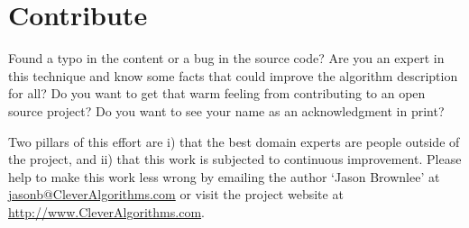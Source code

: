 \documentclass[a4paper, 11pt]{article}
\makeatletter
\newcommand{\myreportauthor}{Jason Brownlee}
\newcommand{\myreportemail}{jasonb@CleverAlgorithms.com}
\newcommand{\myreportwebsite}{http://www.CleverAlgorithms.com}
\makeatother
\begin{document}
% 
% 
\section{Contribute}
\label{sec:contribute}
Found a typo in the content or a bug in the source code? 
Are you an expert in this technique and know some facts that could improve the algorithm description for all?
Do you want to get that warm feeling from contributing to an open source project? 
Do you want to see your name as an acknowledgment in print?

Two pillars of this effort are i) that the best domain experts are people outside of the project, and ii) that this work is subjected to continuous improvement. 
Please help to make this work less wrong by emailing the author `\myreportauthor' at \url{\myreportemail} or visit the project website at \url{\myreportwebsite}.



\end{document}
